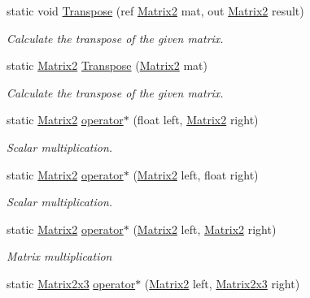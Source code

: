 \begin{DoxyCompactItemize}
static void \hyperlink{struct_open_t_k_1_1_matrix2_a89a584347359cfbc6c6ab96de8f46630}{Transpose} (ref \hyperlink{struct_open_t_k_1_1_matrix2}{Matrix2} mat, out \hyperlink{struct_open_t_k_1_1_matrix2}{Matrix2} result)
\begin{DoxyCompactList}\small\item\em Calculate the transpose of the given matrix. \end{DoxyCompactList}\item 
static \hyperlink{struct_open_t_k_1_1_matrix2}{Matrix2} \hyperlink{struct_open_t_k_1_1_matrix2_a4d3575ac9869c300b5edb8cee7162b70}{Transpose} (\hyperlink{struct_open_t_k_1_1_matrix2}{Matrix2} mat)
\begin{DoxyCompactList}\small\item\em Calculate the transpose of the given matrix. \end{DoxyCompactList}\item 
static \hyperlink{struct_open_t_k_1_1_matrix2}{Matrix2} \hyperlink{struct_open_t_k_1_1_matrix2_ac52c4c5f314ec452200c067aa79e94fc}{operator$\ast$} (float left, \hyperlink{struct_open_t_k_1_1_matrix2}{Matrix2} right)
\begin{DoxyCompactList}\small\item\em Scalar multiplication. \end{DoxyCompactList}\item 
static \hyperlink{struct_open_t_k_1_1_matrix2}{Matrix2} \hyperlink{struct_open_t_k_1_1_matrix2_a0b6e2068039fc41c5706dc2b3ab59fac}{operator$\ast$} (\hyperlink{struct_open_t_k_1_1_matrix2}{Matrix2} left, float right)
\begin{DoxyCompactList}\small\item\em Scalar multiplication. \end{DoxyCompactList}\item 
static \hyperlink{struct_open_t_k_1_1_matrix2}{Matrix2} \hyperlink{struct_open_t_k_1_1_matrix2_a8db8410f7d08b662f04945a9dcbd698f}{operator$\ast$} (\hyperlink{struct_open_t_k_1_1_matrix2}{Matrix2} left, \hyperlink{struct_open_t_k_1_1_matrix2}{Matrix2} right)
\begin{DoxyCompactList}\small\item\em Matrix multiplication \end{DoxyCompactList}\item 
static \hyperlink{struct_open_t_k_1_1_matrix2x3}{Matrix2x3} \hyperlink{struct_open_t_k_1_1_matrix2_a2054614c151f626e51ae2ba5ca8e6f62}{operator$\ast$} (\hyperlink{struct_open_t_k_1_1_matrix2}{Matrix2} left, \hyperlink{struct_open_t_k_1_1_matrix2x3}{Matrix2x3} right)

\end{DoxyCompactItemize}
